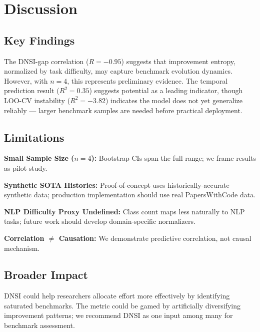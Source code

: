 \section{Discussion}
\label{sec:discussion}

\subsection{Key Findings}

The DNSI-gap correlation ($R = -0.95$) suggests that improvement entropy, normalized by task difficulty, may capture benchmark evolution dynamics. However, with $n=4$, this represents preliminary evidence. The temporal prediction result ($R^2 = 0.35$) suggests potential as a leading indicator, though LOO-CV instability ($R^2 = -3.82$) indicates the model does not yet generalize reliably --- larger benchmark samples are needed before practical deployment.

\subsection{Limitations}

\textbf{Small Sample Size ($n = 4$):} Bootstrap CIs span the full range; we frame results as pilot study.

\textbf{Synthetic SOTA Histories:} Proof-of-concept uses historically-accurate synthetic data; production implementation should use real PapersWithCode data.

\textbf{NLP Difficulty Proxy Undefined:} Class count maps less naturally to NLP tasks; future work should develop domain-specific normalizers.

\textbf{Correlation $\neq$ Causation:} We demonstrate predictive correlation, not causal mechanism.

\subsection{Broader Impact}

DNSI could help researchers allocate effort more effectively by identifying saturated benchmarks. The metric could be gamed by artificially diversifying improvement patterns; we recommend DNSI as one input among many for benchmark assessment.
